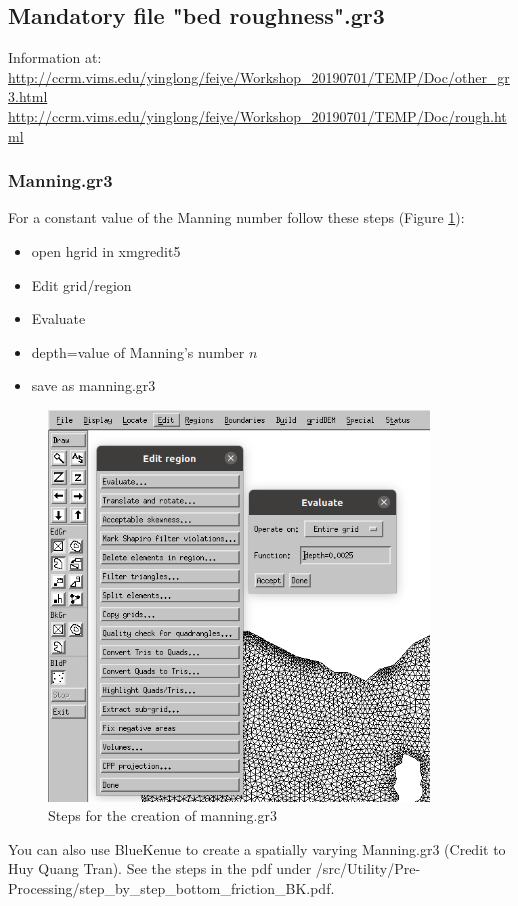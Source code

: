\documentclass[preprints,briefreport,accept,oneauthor,pdftex]{Definitions/mdpi}
\begin{document}
\subsection{Mandatory file "bed roughness".gr3}
\noindent Information at:\\
\url{http://ccrm.vims.edu/yinglong/feiye/Workshop_20190701/TEMP/Doc/other_gr3.html}
\url{http://ccrm.vims.edu/yinglong/feiye/Workshop_20190701/TEMP/Doc/rough.html}
\subsubsection{Manning.gr3}
\noindent For a constant value of the Manning number follow these steps (Figure \ref{fig:hgridman}):
\begin{itemize}
    \item open hgrid in xmgredit5
    \item Edit grid/region
    \item Evaluate
    \item depth={value of Manning's number $n$}
    \item save as manning.gr3
\end{itemize}
\begin{figure}
    \centering
    \includegraphics[width=0.9\textwidth]{figures/manning.png}
    \caption{Steps for the creation of manning.gr3}
    \label{fig:hgridman}
\end{figure}
You can also use BlueKenue to create a spatially varying Manning.gr3 (Credit to Huy Quang Tran). See the steps in the pdf under /src/Utility/Pre-Processing/step\_by\_step\_bottom\_friction\_BK.pdf.
\end{document}
